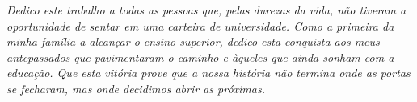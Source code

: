 \begin{dedicatoria}
   \vspace*{\fill}
   \centering
   \noindent
   \textit{  Dedico este trabalho a todas as pessoas que, pelas durezas da vida, não tiveram a oportunidade de sentar em uma carteira de universidade. Como a primeira da minha família a alcançar o ensino superior, dedico esta conquista aos meus antepassados que pavimentaram o caminho e àqueles que ainda sonham com a educação. Que esta vitória prove que a nossa história não termina onde as portas se fecharam, mas onde decidimos abrir as próximas.\vspace*{\fill}}
\end{dedicatoria}



